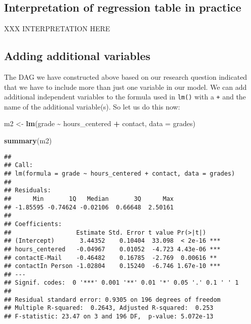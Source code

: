 \documentclass[
]{book}
\newenvironment{Shaded}{\begin{snugshade}}{\end{snugshade}}
\newcommand{\AttributeTok}[1]{\textcolor[rgb]{0.13,0.29,0.53}{#1}}
\newcommand{\FunctionTok}[1]{\textcolor[rgb]{0.13,0.29,0.53}{\textbf{#1}}}
\newcommand{\NormalTok}[1]{#1}
\newcommand{\OtherTok}[1]{\textcolor[rgb]{0.56,0.35,0.01}{#1}}
\newcommand{\SpecialCharTok}[1]{\textcolor[rgb]{0.81,0.36,0.00}{\textbf{#1}}}
\begin{document}
\hypertarget{interpretation-of-regression-table-in-practice}{%
\subsection{Interpretation of regression table in practice}\label{interpretation-of-regression-table-in-practice}}

XXX INTERPRETATION HERE

\hypertarget{adding-additional-variables}{%
\subsection{Adding additional variables}\label{adding-additional-variables}}

The DAG we have constructed above based on our research question indicated that
we have to include more than just one variable in our model.
We can add additional independent variables to the formula used in \texttt{lm()} with a
\texttt{+} and the name of the additional variable(s).
So let us do this now:

\begin{Shaded}
\begin{Highlighting}[]
\NormalTok{m2 }\OtherTok{\textless{}{-}} \FunctionTok{lm}\NormalTok{(grade }\SpecialCharTok{\textasciitilde{}}\NormalTok{ hours\_centered }\SpecialCharTok{+}\NormalTok{ contact, }\AttributeTok{data =}\NormalTok{ grades)}

\FunctionTok{summary}\NormalTok{(m2)}
\end{Highlighting}
\end{Shaded}

\begin{verbatim}
## 
## Call:
## lm(formula = grade ~ hours_centered + contact, data = grades)
## 
## Residuals:
##      Min       1Q   Median       3Q      Max 
## -1.85595 -0.74624 -0.02106  0.66648  2.50161 
## 
## Coefficients:
##                  Estimate Std. Error t value Pr(>|t|)    
## (Intercept)       3.44352    0.10404  33.098  < 2e-16 ***
## hours_centered   -0.04967    0.01052  -4.723 4.43e-06 ***
## contactE-Mail    -0.46482    0.16785  -2.769  0.00616 ** 
## contactIn Person -1.02804    0.15240  -6.746 1.67e-10 ***
## ---
## Signif. codes:  0 '***' 0.001 '**' 0.01 '*' 0.05 '.' 0.1 ' ' 1
## 
## Residual standard error: 0.9305 on 196 degrees of freedom
## Multiple R-squared:  0.2643, Adjusted R-squared:  0.253 
## F-statistic: 23.47 on 3 and 196 DF,  p-value: 5.072e-13
\end{verbatim}
\end{document}
